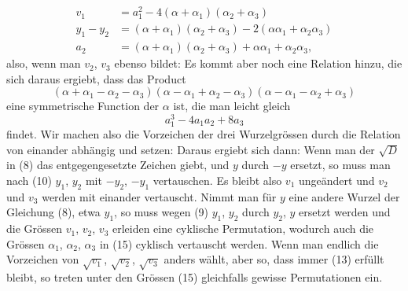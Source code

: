 \[
\begin{aligned}
v_1 &= a_1^2 - 4(\alpha+\alpha_1)(\alpha_2+\alpha_3)\\
y_1-y_2 &= (\alpha+\alpha_1)(\alpha_2+\alpha_3) - 2(\alpha\alpha_1+\alpha_2\alpha_3)\\
a_2 &= (\alpha+\alpha_1)(\alpha_2+\alpha_3) + \alpha\alpha_1 + \alpha_2\alpha_3,
\end{aligned}
\]
also, wenn man $v_2$, $v_3$ ebenso bildet:
Es kommt aber noch eine Relation hinzu, die sich daraus ergiebt, dass das Product
\[
(\alpha+\alpha_1-\alpha_2-\alpha_3)(\alpha-\alpha_1+\alpha_2-\alpha_3)(\alpha-\alpha_1-\alpha_2+\alpha_3)
\]
eine symmetrische Function der $\alpha$ ist, die man leicht gleich
\[
a_1^3 - 4a_1a_2 + 8a_3
\]
findet. Wir machen also die Vorzeichen der drei Wurzelgrössen durch die Relation
von einander abhängig und setzen:
Daraus ergiebt sich dann:
Wenn man der $\sqrt{D}$ in (8) das entgegengesetzte Zeichen giebt, und $y$ durch $-y$ ersetzt, so muss man nach (10) $y_1$, $y_2$ mit $-y_2$, $-y_1$ vertauschen. Es bleibt also $v_1$ ungeändert und $v_2$ und $v_3$ werden mit einander vertauscht. Nimmt man für $y$ eine andere Wurzel der Gleichung (8), etwa $y_1$, so muss wegen (9) $y_1$, $y_2$ durch $y_2$, $y$ ersetzt werden und die Grössen $v_1$, $v_2$, $v_3$ erleiden eine cyklische Permutation, wodurch auch die Grössen $\alpha_1$, $\alpha_2$, $\alpha_3$ in (15) cyklisch vertauscht werden. Wenn man endlich die Vorzeichen von $\sqrt{v_1}$, $\sqrt{v_2}$, $\sqrt{v_3}$ anders wählt, aber so, dass immer (13) erfüllt bleibt, so treten unter den Grössen (15) gleichfalls gewisse Permutationen ein.
